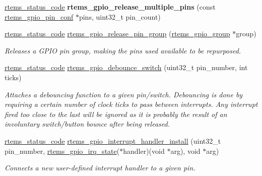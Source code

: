 \begin{DoxyCompactItemize}
\mbox{\label{gpio-support_8c_a1012ba26222c3ba679a0d762051d6451}} 
\mbox{\hyperlink{group__ClassicStatus_ga545d41846817eaba6143d52ee4d9e9fe}{rtems\+\_\+status\+\_\+code}} {\bfseries rtems\+\_\+gpio\+\_\+release\+\_\+multiple\+\_\+pins} (const \mbox{\hyperlink{structrtems__gpio__pin__conf}{rtems\+\_\+gpio\+\_\+pin\+\_\+conf}} $\ast$pins, uint32\+\_\+t pin\+\_\+count)
\item 
\mbox{\hyperlink{group__ClassicStatus_ga545d41846817eaba6143d52ee4d9e9fe}{rtems\+\_\+status\+\_\+code}} \mbox{\hyperlink{gpio-support_8c_abbc68a70ea4826e1ad964f7d53cbd46b}{rtems\+\_\+gpio\+\_\+release\+\_\+pin\+\_\+group}} (\mbox{\hyperlink{structrtems__gpio__group}{rtems\+\_\+gpio\+\_\+group}} $\ast$group)
\begin{DoxyCompactList}\small\item\em Releases a G\+P\+IO pin group, making the pins used available to be repurposed. \end{DoxyCompactList}\item 
\mbox{\hyperlink{group__ClassicStatus_ga545d41846817eaba6143d52ee4d9e9fe}{rtems\+\_\+status\+\_\+code}} \mbox{\hyperlink{gpio-support_8c_abaf46c0d03c01af99d9081038355e7df}{rtems\+\_\+gpio\+\_\+debounce\+\_\+switch}} (uint32\+\_\+t pin\+\_\+number, int ticks)
\begin{DoxyCompactList}\small\item\em Attaches a debouncing function to a given pin/switch. Debouncing is done by requiring a certain number of clock ticks to pass between interrupts. Any interrupt fired too close to the last will be ignored as it is probably the result of an involuntary switch/button bounce after being released. \end{DoxyCompactList}\item 
\mbox{\hyperlink{group__ClassicStatus_ga545d41846817eaba6143d52ee4d9e9fe}{rtems\+\_\+status\+\_\+code}} \mbox{\hyperlink{gpio-support_8c_acc3d502e8578f0b84cf0bdaba043584e}{rtems\+\_\+gpio\+\_\+interrupt\+\_\+handler\+\_\+install}} (uint32\+\_\+t pin\+\_\+number, \mbox{\hyperlink{gpio_8h_a22ef6f3b12eae878a51eaf96f72437ea}{rtems\+\_\+gpio\+\_\+irq\+\_\+state}}($\ast$handler)(void $\ast$arg), void $\ast$arg)
\begin{DoxyCompactList}\small\item\em Connects a new user-\/defined interrupt handler to a given pin. \end{DoxyCompactList}\item 
\mbox{\label{gpio-support_8c_a235803d69baa6d67f7712786ebf984cb}} 

\end{DoxyCompactItemize}
